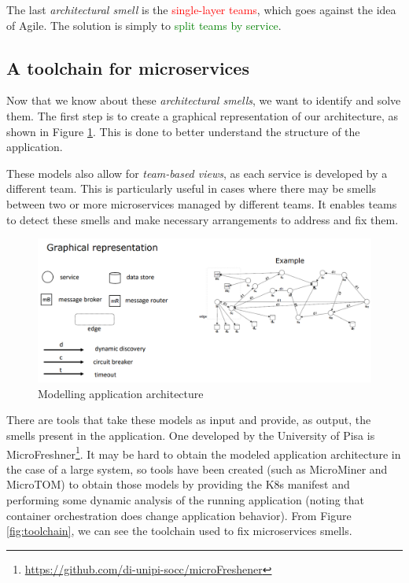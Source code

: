 The last \textit{architectural smell} is the \textcolor{red}{single-layer teams}, which goes against the idea of Agile. The solution is simply to \textcolor{green}{split teams by service}.

\subsection{A toolchain for microservices}

Now that we know about these \textit{architectural smells}, we want to identify and solve them. The first step is to create a graphical representation of our architecture, as shown in Figure \ref{fig:modelling-application-architecture}. This is done to better understand the structure of the application.

These models also allow for \textit{team-based views}, as each service is developed by a different team. This is particularly useful in cases where there may be smells between two or more microservices managed by different teams. It enables teams to detect these smells and make necessary arrangements to address and fix them.

\begin{figure} [H]
    \centering
    \includegraphics[width=1\textwidth]{images/Microservices/modelling-application-architecture.PNG}
    \caption{Modelling application architecture}
    \label{fig:modelling-application-architecture}
\end{figure} 

There are tools that take these models as input and provide, as output, the smells present in the application. One developed by the University of Pisa is MicroFreshner\footnote{\url{https://github.com/di-unipi-socc/microFreshener}}. It may be hard to obtain the modeled application architecture in the case of a large system, so tools have been created (such as MicroMiner and MicroTOM) to obtain those models by providing the K8s manifest and performing some dynamic analysis of the running application (noting that container orchestration does change application behavior). From Figure \ref{fig:toolchain}, we can see the toolchain used to fix microservices smells.

